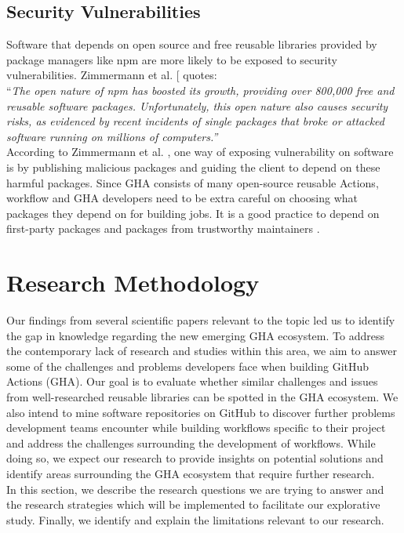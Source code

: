 \documentclass[conference]{IEEEtran}
\begin{document}
\subsection{Security Vulnerabilities}
Software that depends on open source and free reusable libraries provided by package managers like npm are more likely to be exposed to security vulnerabilities. Zimmermann et al. [\cite{b12} quotes: \\

“\textit{The open nature of npm has boosted its growth, providing over 800,000 free and reusable software packages. Unfortunately, this open nature also causes security risks, as evidenced by recent incidents of single packages that broke or attacked software running on millions of computers.”} \\

 According to Zimmermann et al. \cite{b12}, one way of exposing vulnerability on software is by publishing malicious packages and guiding the client to depend on these harmful packages. Since GHA consists of many open-source reusable Actions, workflow and GHA developers need to be extra careful on choosing what packages they depend on for building jobs. It is a good practice to depend on first-party packages and packages from trustworthy maintainers \cite{b12}.


\section{Research Methodology}
Our findings from several scientific papers relevant to the topic led us to identify the gap in knowledge regarding the new emerging GHA ecosystem. To address the contemporary lack of research and studies within this area, we aim to answer some of the challenges and problems developers face when building GitHub Actions (GHA). Our goal is to evaluate whether similar challenges and issues from well-researched reusable libraries can be spotted in the GHA ecosystem. We also intend to mine software repositories on GitHub to discover further problems development teams encounter while building workflows specific to their project and address the challenges surrounding the development of workflows. While doing so, we expect our research to provide insights on potential solutions and identify areas surrounding the GHA ecosystem that require further research.\\

In this section, we describe the research questions we are trying to answer and the research strategies which will be implemented to facilitate our explorative study. Finally, we identify and explain the limitations relevant to our research.
\end{document}
